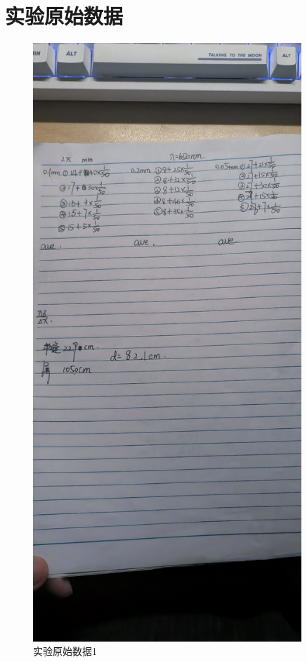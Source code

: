 \documentclass{ctexart}
\begin{document}
\section{实验原始数据}
\begin{figure}[H]
  \centering
  \includegraphics[width=0.9\textwidth,height=0.8\textheight]{yuanshishujv1.jpg}
  \caption{实验原始数据1}
\end{figure}
\newpage
\end{document}
